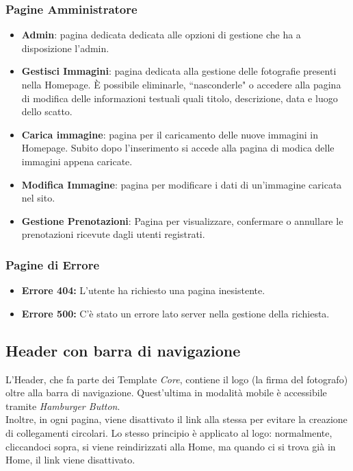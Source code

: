 \subsubsection{Pagine Amministratore}
\begin{itemize}
\item \textbf{Admin}: pagina dedicata dedicata alle opzioni di gestione che ha a disposizione l'admin.
\item \textbf{Gestisci Immagini}: pagina dedicata alla gestione delle fotografie presenti nella Homepage. \`E possibile eliminarle,
 ``nasconderle" o accedere alla pagina di modifica delle informazioni testuali quali titolo, descrizione, data e luogo dello scatto.
\item \textbf{Carica immagine}: pagina per il caricamento delle nuove immagini in Homepage. Subito dopo l'inserimento 
si accede alla pagina di modica delle immagini appena caricate.
\item \textbf{Modifica Immagine}: pagina per modificare i dati di un'immagine caricata nel sito.
\item \textbf{Gestione Prenotazioni}: Pagina per visualizzare, confermare o annullare le prenotazioni ricevute dagli utenti registrati.
\end{itemize}

\subsubsection{Pagine di Errore}
\begin{itemize}
    \item \textbf{Errore 404:} L'utente ha richiesto una pagina inesistente.
    \item \textbf{Errore 500:} C'\`e stato un errore lato server nella gestione della richiesta.
\end{itemize}
\subsection{Header con barra di navigazione}
L'Header, che fa parte dei Template \textit{Core}, contiene il logo (la firma del fotografo) oltre alla barra di navigazione. Quest'ultima in modalit\`a mobile \`e accessibile tramite \textit{Hamburger Button}.\\
Inoltre, in ogni pagina, viene disattivato il link alla stessa per evitare la creazione di collegamenti circolari. Lo stesso principio è applicato al logo: normalmente, cliccandoci sopra, si viene reindirizzati alla Home, ma quando ci si trova già in Home, il link viene disattivato.

